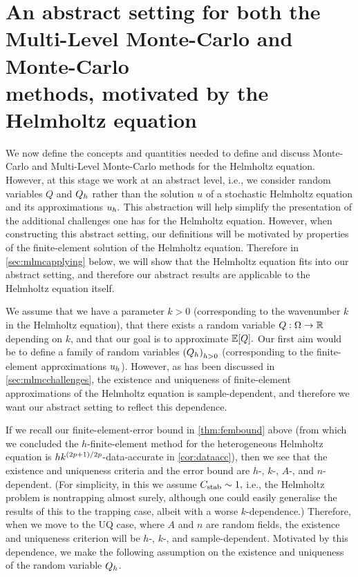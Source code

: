 \section[Abstract MC and MLMC setting]{An abstract setting for both the\\Multi-Level Monte-Carlo and Monte-Carlo\\methods, motivated by the Helmholtz equation}\label{sec:mlmcsetup}
We now define the concepts and quantities needed to define and discuss Monte-Carlo and Multi-Level Monte-Carlo methods for the Helmholtz equation. However, at this stage we work at an abstract level, i.e., we consider random variables $Q$ and $Q_{h}$ rather than the solution $u$ of a stochastic Helmholtz equation and its approximations $u_{h}.$ This abstraction will help simplify the presentation of the additional challenges one has for the Helmholtz equation. However, when constructing this abstract setting, our definitions will be motivated by properties of the finite-element solution of the Helmholtz equation. Therefore in \cref{sec:mlmcapplying} below, we will show that the Helmholtz equation fits into our abstract setting, and therefore our abstract results are applicable to the Helmholtz equation itself.

We assume that we have a parameter $k>0$ (corresponding to the wavenumber $k$ in the Helmholtz equation), that there exists a random variable $Q:\Omega\rightarrow\mathbb R$ depending on $k$, and that our goal is to approximate $\EXP{Q}.$ Our first aim would be to define a family of random variables $\mleft(\Qh\mright)_{h>0}$ (corresponding to the finite-element approximations $u_{h}$). However, as has been discussed in \cref{sec:mlmcchallenges}, the existence and uniqueness of finite-element approximations of the Helmholtz equation is sample-dependent, and therefore we want our abstract setting to reflect this dependence.

If we recall our finite-element-error bound in \cref{thm:fembound} above (from which we concluded the $h$-finite-element method for the heterogeneous Helmholtz equation is $hk^{(2p+1)/2p}$-data-accurate in \cref{cor:dataacc}), then we see that the existence and uniqueness criteria and the error bound are $h$-, $k$-, $A$-, and $n$-dependent. (For simplicity, in this  we assume $C_{\mathrm{stab}} \sim 1,$ i.e., the Helmholtz problem is nontrapping almost surely, although one could easily generalise the results of this  to the trapping case, albeit with a worse $k$-dependence.) Therefore, when we move to the UQ case, where $A$ and $n$ are random fields, the existence and uniqueness criterion will be $h$-, $k$-, and sample-dependent. Motivated by this dependence, we make the following assumption on the existence and uniqueness of the random variable $Q_{h}$.

